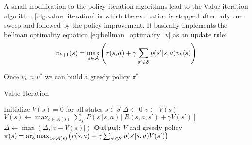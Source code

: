 A small modification to the policy iteration algorithms lead to the Value iteration algorithm \ref{alg:value_iteration} in which the evaluation is stopped after only one sweep
and followed by the policy improvement. It basically implements the bellman optimality equation \eqref{eq:bellman_optimality_v} as an update rule:
\begin{equation*}
    v_{k+1}(s) = \max_{a \in \mathcal{A}}\left(r(s,a) + \gamma\sum_{s' \in \mathcal{S}}p(s'|s,a)v_k(s)\right)
\end{equation*}

Once $v_k \approx v^*$ we can build a greedy policy $\pi^*$

\begin{algorithm}[H]
    \caption{Value Iteration}\label{alg:value_iteration}
    \begin{algorithmic}[1]
    \STATE Initialize $V(s) = 0$ for all states $s \in S$
    \REPEAT
        \STATE $\Delta \gets 0$
            \STATE $v \gets V(s)$
            \STATE $V(s) \gets \max_{a \in A(s)} \sum_{s'} P(s'|s,a) \left[ R(s,a,s') + \gamma V(s') \right]$
            \STATE $\Delta \gets \max(\Delta, |v - V(s)|)$
        \ENDFOR
    \UNTIL{$\Delta < \theta$}
    \STATE \textbf{Output:} $V$ and greedy policy $\pi(s) = \operatorname*{arg\,max}_{a \in \mathcal{A}(s)}\left(r(s,a) + \gamma\sum_{s' \in \mathcal{S}}p(s'|s,a)V(s')\right)$
    \end{algorithmic}
    \end{algorithm}

